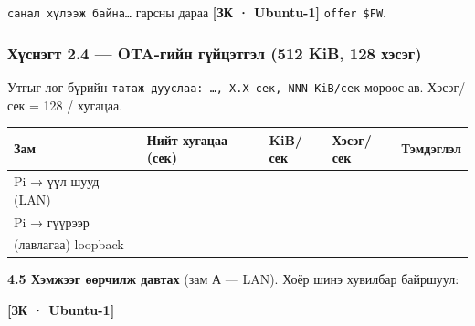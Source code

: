 \texttt{санал\ хүлээж\ байна\ldots{}} гарсны дараа \textbf{{[}ЗК · Ubuntu-1{]}} \texttt{offer\ \$FW}.

\hypertarget{ux445ux4afux441ux43dux44dux433ux442-2.4-ota-ux433ux438ux439ux43d-ux433ux4afux439ux446ux44dux442ux433ux44dux43b-512-kib-128-ux445ux44dux441ux44dux433}{%
\subsubsection{Хүснэгт 2.4 --- OTA-гийн гүйцэтгэл (512 KiB, 128 хэсэг)}\label{ux445ux4afux441ux43dux44dux433ux442-2.4-ota-ux433ux438ux439ux43d-ux433ux4afux439ux446ux44dux442ux433ux44dux43b-512-kib-128-ux445ux44dux441ux44dux433}}

Утгыг лог бүрийн \texttt{татаж\ дууслаа:\allowbreak{}\ \ldots{},\ X.\allowbreak{}X\ сек,\ NNN\ KiB/\allowbreak{}сек} мөрөөс ав. Хэсэг/сек = 128 / хугацаа.

\begingroup\scriptsize\begin{longtable}[]{@{}lllll@{}}
\toprule
Зам & Нийт хугацаа (сек) & KiB/сек & Хэсэг/сек & Тэмдэглэл\tabularnewline
\midrule
\endhead
Pi → үүл шууд (LAN) & & & &\tabularnewline
Pi → гүүрээр & & & &\tabularnewline
(лавлагаа) loopback & & & &\tabularnewline
\bottomrule
\end{longtable}\endgroup

\textbf{4.5 Хэмжээг өөрчилж давтах} (зам А --- LAN). Хоёр шинэ хувилбар байршуул:

\textbf{{[}ЗК · Ubuntu-1{]}}

\begin{Shaded}
\begin{Highlighting}[]
\OperatorTok{\textgreater{}}
\OperatorTok{\textgreater{}}
 \KeywordTok{|} \VariableTok{)}
 \KeywordTok{|} \VariableTok{)}
  \KeywordTok{|} \KeywordTok{;}   \KeywordTok{|} 
\end{Highlighting}
\end{Shaded}

